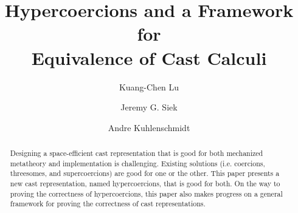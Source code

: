 \documentclass[acmsmall,review]{acmart}\settopmatter{printfolios=true,printccs=false,printacmref=false}
\begin{document}
\title{Hypercoercions and a Framework for \\ Equivalence of Cast Calculi}


\author{Kuang-Chen Lu}



\author{Jeremy G. Siek}


\author{Andre Kuhlenschmidt}



\begin{abstract}
  Designing a space-efficient cast representation that is good for
  both mechanized metatheory and implementation is
  challenging. Existing solutions (i.e. coercions, threesomes, and 
  supercoercions) are good for one or the other. This
  paper presents a new cast representation, named hypercoercions, that
  is good for both. On the way to proving the correctness of
  hypercoercions, this paper also makes progress on a general
  framework for proving the correctness of cast representations.
\end{abstract}
\end{document}
